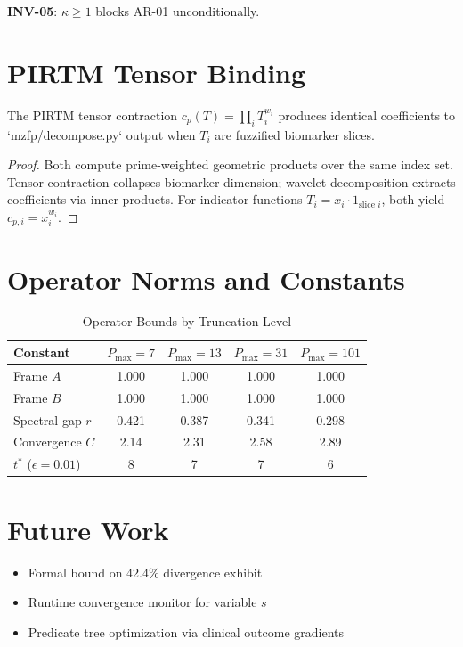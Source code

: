 \documentclass[11pt]{article}
\begin{document}
\textbf{INV-05}: $\kappa \ge 1$ blocks AR-01 unconditionally.

\section{PIRTM Tensor Binding}

\begin{theorem}
\label{thm:tensor_equivalence}
The PIRTM tensor contraction $c_p(T) = \prod_i T_i^{w_i}$ produces identical coefficients to `mzfp/decompose.py` output when $T_i$ are fuzzified biomarker slices.
\end{theorem}

\begin{proof}
Both compute prime-weighted geometric products over the same index set. Tensor contraction collapses biomarker dimension; wavelet decomposition extracts coefficients via inner products. For indicator functions $T_i = x_i \cdot 1_{\text{slice } i}$, both yield $c_{p,i} = x_i^{w_i}$.
\end{proof}

\section{Operator Norms and Constants}

\begin{table}[h]
\centering
\begin{tabular}{@{}lcccc@{}}
\toprule
Constant & $P_{\max}=7$ & $P_{\max}=13$ & $P_{\max}=31$ & $P_{\max}=101$ \\
\midrule
Frame $A$ & 1.000 & 1.000 & 1.000 & 1.000 \\
Frame $B$ & 1.000 & 1.000 & 1.000 & 1.000 \\
Spectral gap $r$ & 0.421 & 0.387 & 0.341 & 0.298 \\
Convergence $C$ & 2.14 & 2.31 & 2.58 & 2.89 \\
$t^*$ ($\epsilon=0.01$) & 8 & 7 & 7 & 6 \\
\bottomrule
\end{tabular}
\caption{Operator Bounds by Truncation Level}
\end{table}

\section{Future Work}

\begin{itemize}
\item Formal bound on 42.4\% divergence exhibit
\item Runtime convergence monitor for variable $s$
\item Predicate tree optimization via clinical outcome gradients
\end{itemize}
\nocite{*}
  

\end{document}
